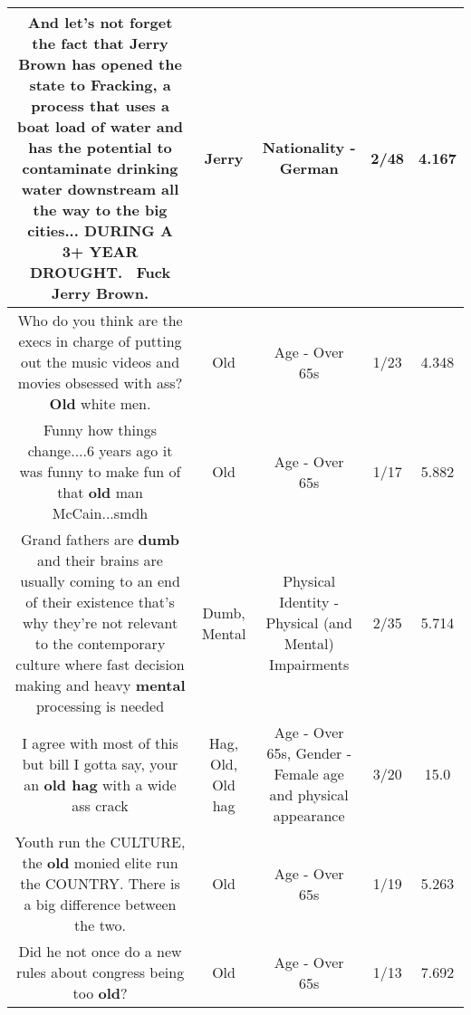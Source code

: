 \documentclass[11pt]{article}
\newlength\mylength
\begin{document}
\begin{center}
\begin{longtable}{|C{.65\mylength}|C{.30\mylength}|C{.12\mylength}|C{.12\mylength}|C{.12\mylength}|}
  \small And let's not forget the fact that \textbf{Jerry} Brown has opened the state to Fracking, a process that uses a boat load of water and has the potential to contaminate drinking water downstream all the way to the big cities... DURING A 3+ YEAR DROUGHT.  Fuck \textbf{Jerry} Brown.\normalsize   & Jerry & Nationality - German & 2/48 & 4.167 \\  \hline
  \small Who do you think are the execs in charge of putting out the music videos and movies obsessed with ass? \textbf{Old} white men.\normalsize   & Old & Age - Over 65s & 1/23 & 4.348 \\  \hline
  \small Funny how things change....6 years ago it was funny to make fun of that \textbf{old} man McCain...smdh\normalsize   & Old & Age - Over 65s & 1/17 & 5.882 \\  \hline
  \small Grand fathers are \textbf{dumb} and their brains are usually coming to an end of their existence that's why they're not relevant to the contemporary culture where fast decision making and heavy \textbf{mental} processing is needed\normalsize   & Dumb, Mental & Physical Identity - Physical (and Mental) Impairments & 2/35 & 5.714 \\  \hline
  \small I agree with most of this but bill I gotta say, your an \textbf{o\textbf{ld} h\textbf{ag}} with a wide ass crack\normalsize   & Hag, Old, Old hag & Age - Over 65s, Gender - Female age and physical appearance & 3/20 & 15.0 \\  \hline
  \small Youth run the CULTURE, the \textbf{old} monied elite run the COUNTRY. There is a big difference between the two.\normalsize   & Old & Age - Over 65s & 1/19 & 5.263 \\  \hline
  \small Did he not once do a new rules about congress being too \textbf{old}?\normalsize   & Old & Age - Over 65s & 1/13 & 7.692 \\  \hline

\end{longtable}
\end{center}
\end{document}
